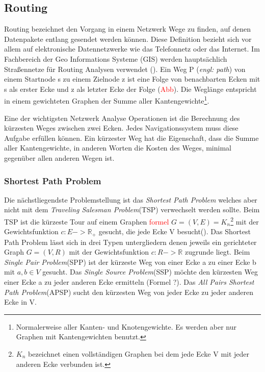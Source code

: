 \documentclass[10pt,a4paper]{article}
\newcommand\todo[1]{\textcolor{red}{#1}}
\begin{document}
\subsection{Routing}

Routing bezeichnet den Vorgang in einem Netzwerk Wege zu finden, auf denen Datenpakete entlang gesendet werden können. Diese Definition bezieht sich vor allem auf elektronische Datennetzwerke wie das Telefonnetz oder das Internet. Im Fachbereich der Geo Informations Systeme (GIS) werden hauptsächlich Straßennetze für Routing Analysen verwendet (\cite[165]{handbook}). Ein Weg P (\textit{engl: path}) von einem Startnode s zu einem Zielnode z ist eine Folge von benachbarten Ecken mit s als erster Ecke und z als letzter Ecke der Folge (\todo{Abb}).
Die Weglänge entspricht in einem gewichteten Graphen der Summe aller Kantengewichte\footnote{Normalerweise aller Kanten- und Knotengewichte. Es werden aber nur Graphen mit Kantengewichten benutzt.}.

Eine der wichtigsten Netzwerk Analyse Operationen ist die Berechnung des kürzesten Weges zwischen zwei Ecken. Jedes Navigationssystem muss diese Aufgabe erfüllen können. Ein kürzester Weg hat die Eigenschaft, dass die Summe aller Kantengewichte, in anderen Worten die Kosten des Weges, minimal gegenüber allen anderen Wegen ist.

\subsubsection{Shortest Path Problem}
Die nächstliegendste Problemstellung ist das \textit{Shortest Path Problem} welches aber nicht mit dem \textit{Traveling Salesman Problem}(TSP) verwechselt werden sollte. Beim TSP ist die kürzeste Tour auf einem Graphen \todo{formel} $G  = (V,E) = K_{n}$\footnote{$K_{n}$ bezeichnet einen vollständigen Graphen bei dem jede Ecke V mit jeder anderen Ecke verbunden ist.} mit der Gewichtsfunktion $c: E -> \mathbb{R}_{+}$ gesucht, die jede Ecke V besucht(\cite[135]{algorithms}).
Das Shortest Path Problem lässt sich in drei Typen untergliedern denen jeweils ein gerichteter Graph $G = (V,R)$ mit der Gewichtsfunktion $c: R -> \mathbb{R}$ zugrunde liegt. Beim \textit{Single Pair Problem}(SPP) ist der kürzeste Weg von einer Ecke a zu einer Ecke b mit $a,b\in V$ gesucht. Das \textit{Single Source Problem}(SSP) möchte den kürzesten Weg einer Ecke a zu jeder anderen Ecke ermitteln (Formel ?). Das \textit{All Pairs Shortest Path Problem}(APSP) sucht den kürzesten Weg von jeder Ecke zu jeder anderen Ecke in V. \cite[169f]{algorithms}
\end{document}
